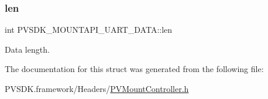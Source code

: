 \subsubsection{\texorpdfstring{len}{len}}
{\footnotesize\ttfamily int P\+V\+S\+D\+K\+\_\+\+M\+O\+U\+N\+T\+A\+P\+I\+\_\+\+U\+A\+R\+T\+\_\+\+D\+A\+T\+A\+::len}



Data length. 



The documentation for this struct was generated from the following file\+:\begin{DoxyCompactItemize}
\item 
P\+V\+S\+D\+K.\+framework/\+Headers/\hyperlink{_p_v_mount_controller_8h}{P\+V\+Mount\+Controller.\+h}\end{DoxyCompactItemize}
